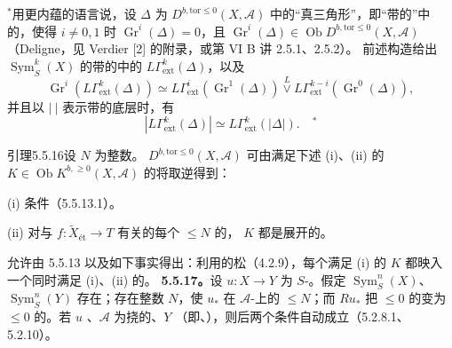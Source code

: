 $^*$用更内蕴的语言说，设 $\Delta$ 为 $D^{b,\mathrm{tor}\leq0}(X,\mathscr A)$ 中的“真三角形”，即“带的”中的，使得 $i\ne0,1$ 时 $\operatorname{Gr}^i(\Delta)=0$，且 $\operatorname{Gr}^i(\Delta)\in\operatorname{Ob}D^{b,\mathrm{tor}\leq0}(X,\mathscr A)$（Deligne，见 Verdier [2] 的附录，或第 VI B 讲 2.5.1、2.5.2）。
前述构造给出 $\operatorname{Sym}^k_S(X)$ 的带的中的 $L\Gamma^k_{\mathrm{ext}}(\Delta)$，以及
\[\operatorname{Gr}^i(L\Gamma^k_{\mathrm{ext}}(\Delta))\simeq L\Gamma^i_{\mathrm{ext}}(\operatorname{Gr}^1(\Delta))\overset L\vee L\Gamma^{k-i}_{\mathrm{ext}}(\operatorname{Gr}^0(\Delta)),\]
并且以 $|\ |$ 表示带的底层时，有
\[|L\Gamma^k_{\mathrm{ext}}(\Delta)|\simeq L\Gamma^k_{\mathrm{ext}}(|\Delta|).\quad{}^*\]
\begin{SGAresult}{引理}{5.5.16}设 $N$ 为整数。 $D^{b,\mathrm{tor}\leq0}(X,\mathscr A)$ 可由满足下述 (i)、(ii) 的 $K\in\operatorname{Ob}K^{b,\geq0}(X,\mathscr A)$ 的将取逆得到：

(i) 条件（5.5.13.1）。

(ii) 对与 $f:\widetilde X_{\text{ét}}\to T$ 有关的每个 $\leq N$ 的， $K$ 都是展开的。
\end{SGAresult}
允许由 5.5.13 以及如下事实得出：利用的松（4.2.9），每个满足 (i) 的 $K$ 都映入一个同时满足 (i)、(ii) 的。
\textbf{5.5.17。}设 $u:X\to Y$ 为 $S$-。假定 $\operatorname{Sym}^n_S(X)$、$\operatorname{Sym}^n_S(Y)$ 存在；存在整数 $N$，使 $u_*$ 在 $\mathscr A$-上的 $\leq N$；而 $Ru_*$ 把  $\leq0$ 的变为  $\leq0$ 的。若 $u$ 、$\mathscr A$ 为挠的、$Y$ （即、），则后两个条件自动成立（5.2.8.1、5.2.10）。
